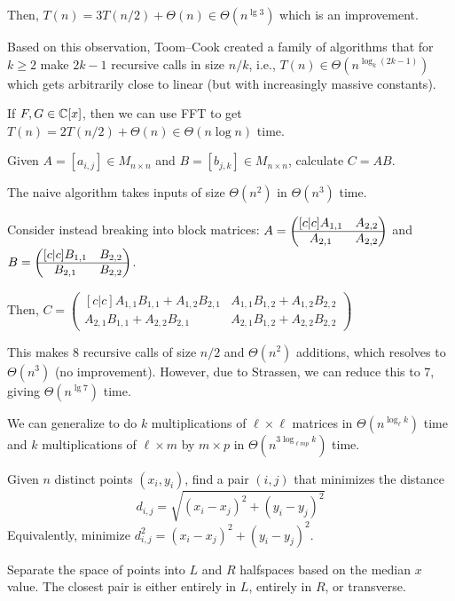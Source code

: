 Then, $T(n) = 3T(n/2) + \Theta(n) \in \Theta(n^{\lg 3})$ which is an improvement.

Based on this observation, Toom--Cook created a family of algorithms
that for $k \geq 2$ make $2k-1$ recursive calls in size $n/k$,
i.e., $T(n) \in \Theta(n^{\log_k(2k-1)})$ which gets arbitrarily close to linear
(but with increasingly massive constants).

If $F,G \in \mathbb{C}[x]$, then we can use FFT to get $T(n) = 2T(n/2)+\Theta(n) \in \Theta(n\log n)$ time.

\begin{problem}
  Given $A = [a_{i,j}] \in M_{n\times n}$ and $B = [b_{j,k}] \in M_{n \times n}$,
  calculate $C = AB$.
\end{problem}

The naive algorithm takes inputs of size $\Theta(n^2)$ in $\Theta(n^3)$ time.

Consider instead breaking into block matrices:
$A = \pmqty[c|c]{A_{1,1}&A_{2,2}\\\hline A_{2,1}&A_{2,2}}$ and
$B = \pmqty[c|c]{B_{1,1}&B_{2,2}\\\hline B_{2,1}&B_{2,2}}$.

Then, $C = \begin{pmatrix}[c|c]
    A_{1,1}B_{1,1} + A_{1,2}B_{2,1} & A_{1,1}B_{1,2} + A_{1,2}B_{2,2} \\ \hline
    A_{2,1}B_{1,1} + A_{2,2}B_{2,1} & A_{2,1}B_{1,2} + A_{2,2}B_{2,2}
  \end{pmatrix}$

This makes 8 recursive calls of size $n/2$ and $\Theta(n^2)$ additions,
which resolves to $\Theta(n^3)$ (no improvement).
However, due to Strassen, we can reduce this to 7, giving $\Theta(n^{\lg 7})$ time.

We can generalize to do $k$ multiplications of $\ell\times\ell$ matrices in $\Theta(n^{\log_\ell k})$ time
and $k$ multiplications of $\ell\times m$ by $m\times p$ in $\Theta(n^{3\log_{\ell m p}k})$ time.

\begin{problem}
  Given $n$ distinct points $(x_i, y_i)$,
  find a pair $(i,j)$ that minimizes the distance
  \[ d_{i,j} = \sqrt{(x_i-x_j)^2+(y_i-y_j)^2} \]
  Equivalently, minimize $d^2_{i,j} = (x_i-x_j)^2+(y_i-y_j)^2$.
\end{problem}

Separate the space of points into $L$ and $R$ halfspaces based on the median $x$ value.
The closest pair is either entirely in $L$, entirely in $R$, or transverse.

